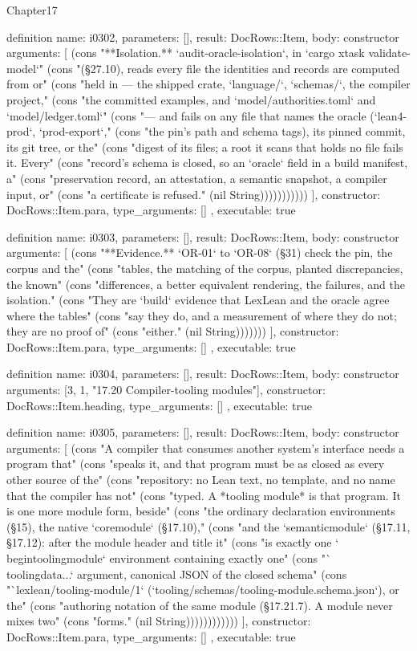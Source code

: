 \begin{lexlean}{Chapter17}
\begin{semanticmodule}
definition{
  name: i0302,
  parameters: [],
  result: DocRows::Item,
  body: constructor{
    arguments: [
      (cons "**Isolation.** `audit-oracle-isolation`, in `cargo xtask validate-model`" (cons "(§27.10), reads every file the identities and records are computed from or" (cons "held in --- the shipped crate, `language/`, `schemas/`, the compiler project," (cons "the committed examples, and `model/authorities.toml` and `model/ledger.toml`" (cons "--- and fails on any file that names the oracle (`lean4-prod`, `prod-export`," (cons "the pin's path and schema tags), its pinned commit, its git tree, or the" (cons "digest of its files; a root it scans that holds no file fails it. Every" (cons "record's schema is closed, so an `oracle` field in a build manifest, a" (cons "preservation record, an attestation, a semantic snapshot, a compiler input, or" (cons "a certificate is refused." (nil String)))))))))))
    ],
    constructor: DocRows::Item.para,
    type_arguments: []
  },
  executable: true
}

definition{
  name: i0303,
  parameters: [],
  result: DocRows::Item,
  body: constructor{
    arguments: [
      (cons "**Evidence.** `OR-01` to `OR-08` (§31) check the pin, the corpus and the" (cons "tables, the matching of the corpus, planted discrepancies, the known" (cons "differences, a better equivalent rendering, the failures, and the isolation." (cons "They are `build` evidence that LexLean and the oracle agree where the tables" (cons "say they do, and a measurement of where they do not; they are no proof of" (cons "either." (nil String)))))))
    ],
    constructor: DocRows::Item.para,
    type_arguments: []
  },
  executable: true
}

definition{
  name: i0304,
  parameters: [],
  result: DocRows::Item,
  body: constructor{
    arguments: [3, 1, "17.20 Compiler-tooling modules"],
    constructor: DocRows::Item.heading,
    type_arguments: []
  },
  executable: true
}

definition{
  name: i0305,
  parameters: [],
  result: DocRows::Item,
  body: constructor{
    arguments: [
      (cons "A compiler that consumes another system's interface needs a program that" (cons "speaks it, and that program must be as closed as every other source of the" (cons "repository: no Lean text, no template, and no name that the compiler has not" (cons "typed. A *tooling module* is that program. It is one more module form, beside" (cons "the ordinary declaration environments (§15), the native `coremodule` (§17.10)," (cons "and the `semanticmodule` (§17.11, §17.12): after the module header and title it" (cons "is exactly one `\\begin{toolingmodule}` environment containing exactly one" (cons "`\\toolingdata{...}` argument, canonical JSON of the closed schema" (cons "`lexlean/tooling-module/1` (`tooling/schemas/tooling-module.schema.json`), or the" (cons "authoring notation of the same module (§17.21.7). A module never mixes two" (cons "forms." (nil String))))))))))))
    ],
    constructor: DocRows::Item.para,
    type_arguments: []
  },
  executable: true
}


\end{semanticmodule}
\end{lexlean}
